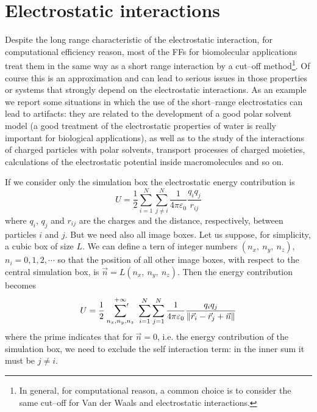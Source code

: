 \section{Electrostatic interactions}
\label{sec:electrostaticInt}
Despite the long range characteristic of the electrostatic interaction, for computational efficiency reason, most
of the \acp{FF} for biomolecular applications treat them in the same way as a short range interaction by a
cut--off method\footnote{In general, for computational reason, a common choice is to consider the same cut--off
for Van der Waals and electrostatic interactions.}. Of course this is an approximation and can lead to serious
issues in those properties or systems that strongly depend on the electrostatic interactions. As an example we
report some situations in which the use of the short--range electrostatics can lead to artifacts: they are
related to the development of a good polar solvent model (a good treatment of the electrostatic properties of
water is really important for biological applications), as well as to the study of the interactions of charged
particles with polar solvents, transport processes of charged moieties, calculations of the electrostatic
potential inside macromolecules and so on.

If we consider only the simulation box the electrostatic energy contribution is
\begin{equation}
	U = \frac{1}{2}\sum_{i=1}^N\sum_{j\ne i}^N\frac{1}{4\pi\varepsilon_0}\frac{q_iq_j}{r_{ij}}
	\label{eq:electrostatic}
\end{equation}
where $q_i$, $q_j$ and $r_{ij}$ are the charges and the distance, respectively, between particles $i$ and $j$.
But we need also all image boxes. Let us suppose, for simplicity, a cubic box of size $L$. We can
define a tern of integer numbers $(n_x,\ n_y,\ n_z)$, $n_i=0,1,2,\cdots$ so that the position of all other image
boxes, with respect to the central simulation box, is $\vec n = L (n_x,\ n_y,\ n_z)$. Then the energy
contribution becomes
\begin{equation}
	U = \frac{1}{2}\ \sideset{}{'}\sum_{n_x,n_y,n_z}^{+\infty}\ \sum_{i=1}^N\sum_{j=1}^N\frac{1}{4\pi\varepsilon_0}\frac{q_iq_j}{\|\vec r_i - \vec r_j + \vec n \|}
	\label{eq:electrostaticImage}
\end{equation}
where the prime indicates that for $\vec n = 0$, i.e. the energy contribution of the simulation box, we need to
exclude the self interaction term: in the inner sum it must be $j \ne i$.

